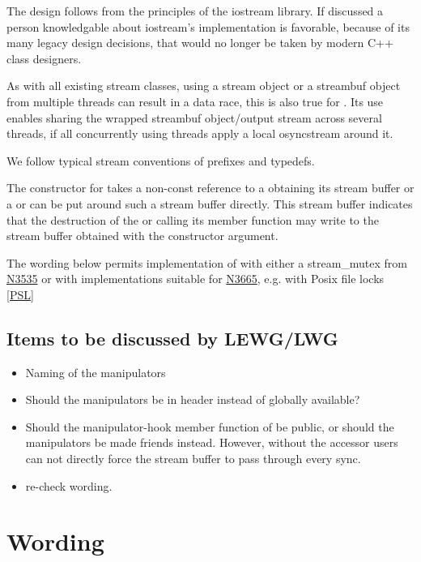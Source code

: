 \documentclass[ebook,11pt,article]{memoir}
\begin{document}
The design follows from the principles of the iostream library. If discussed a person knowledgable about iostream's implementation is favorable, because of its many legacy design decisions, that would no longer be taken by modern C++ class designers. 
 
As with all existing stream classes, using a stream object or a streambuf object from multiple threads can result in a data race, this is also true for . Its use enables sharing the wrapped streambuf object/output stream across several threads, if all concurrently using threads apply a local osyncstream around it.

We follow typical stream conventions of  prefixes and typedefs.

The constructor for  takes a non-const reference to a  obtaining its stream buffer or a  or can be put around such a stream buffer directly. This stream buffer indicates that the destruction of the  or calling its  member function may write to the stream buffer obtained with the constructor argument.

The wording below permits implementation of  with either a stream_mutex from \href{https://wg21.link/n3535}{N3535} or with implementations suitable for \href{https://wg21.link/N3665}{N3665}, e.g. with Posix file locks \href{http://pubs.opengroup.org/onlinepubs/009695399/functions/flockfile.html}{[PSL]}

\section{Items to be discussed by LEWG/LWG}
\begin{itemize}
\item Naming of the manipulators
\item Should the manipulators be in header  instead of globally available?
\item Should the manipulator-hook member function of  be public, or should the manipulators be made friends instead. However, without the accessor users can not directly force the stream buffer to pass through every sync.
\item re-check wording.
\end{itemize}


\chapter{Wording}
\end{document}
